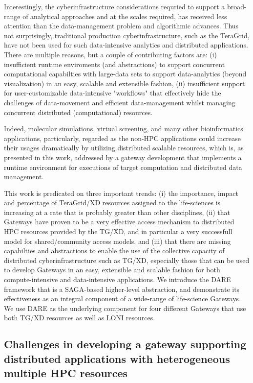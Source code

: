 \documentclass{sig-alternate}
\begin{document}
Interestingly, the cyberinfrastructure considerations requried to
support a broad-range of analytical approaches and at the scales
required, has received less attention than the data-management problem
and algorithmic advances.  Thus not surprisingly, traditional
production cyberinfrastructure, such as the TeraGrid, have not been
used for such data-intensive analytics and distributed applications. There are multiple reasons,
but a couple of contributing factors are: (i) insufficient runtime
enviroments (and abstractions) to support concurrent computational
capabilties with large-data sets to support data-analytics (beyond
visualization) in an easy, scalable and extensible fashion, (ii)
insufficient support for user-customizable data-intensive "workflows"
that effectively hide the challenges of data-movement and efficient
data-management whilst managing concurrent distributed (computational)
resources.

Indeed, molecular simulations, virtual screening, and many other bioinformatics applications, particularly, regarded as the non-HPC applications could increase their usages dramatically by utilizing distributed scalable resources, which is, as presented in this work, addressed by a gateway development that implements a runtime environment for executions of target computation and distributed data management.

This work is predicated on three important trends: (i) the importance,
impact and percentage of TeraGrid/XD resources assigned to the
life-sciences is increasing at a rate that is probably greater than
other disciplines, (ii) that Gateways have proven to be a very
effective access mechanism to distributed HPC resources provided by
the TG/XD, and in particular a very successfull model for
shared/community access models, and (iii) that there are missing
capabilties and abstractions to enable the use of the collective
capacity of distributed cyberinfrastructure such as TG/XD, especially
those that can be used to develop Gateways in an easy, extensible and
scalable fashion for both compute-intensive and data-intensive
applications. We introduce the DARE framework that is a SAGA-based
higher-level abstraction, and demonstrate its effectiveness as an
integral component of a wide-range of life-science Gateways. We
use DARE as the underlying component for four different
Gateways that use both TG/XD resources as well as LONI resources.


\subsection{Challenges in developing a gateway supporting distributed applications with heterogeneous multiple HPC resources}
\end{document}
